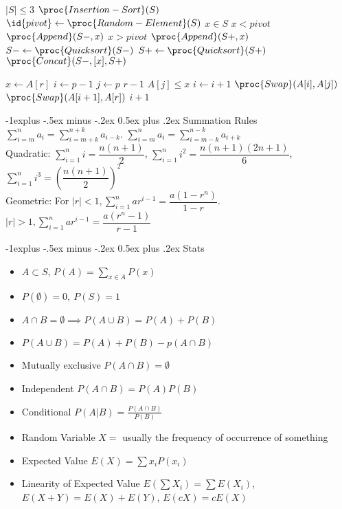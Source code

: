 \documentclass[letterpaper, 8pt]{extarticle}
\makeatletter
\renewcommand{\section}{\@startsection{section}{1}{0mm}%
                                {-1explus -.5ex minus -.2ex}%
                                {0.5ex plus .2ex}%
                                {\normalfont\normalsize\bfseries}}
\renewcommand{\subsection}{\@startsection{subsection}{2}{0mm}%
                                {-1explus -.5ex minus -.2ex}%
                                {0.5ex plus .2ex}%
                                {\normalfont\small\bfseries}}
\makeatother
\begin{document}
\begin{multicols*}{5}
\begin{codebox}
\li \If $|S| \leq 3$ \Then
\li     \Return $\proc{Insertion-Sort}(S)$
\li \Else
\li     $\id{pivot} \gets \proc{Random-Element}(S)$
\li     \For $x \in S$ \Do
\li         \If $x < pivot$ \Then
\li             $\proc{Append}(S-, x)$
            \End
\li         \If $x > pivot$ \Then
\li             $\proc{Append}(S+, x)$
            \End
        \End
\li     $S- \gets \proc{Quicksort}(S-)$
\li     $S+ \gets \proc{Quicksort}(S+)$
\li     \Return $\proc{Concat}(S-, [x], S+)$
\end{codebox}

\begin{codebox}
\li $x \gets A[r]$
\li $i \gets p - 1$
\li \For $j \gets p$ \To $r - 1$ \Do
\li     \If $A[j] \leq x$ \Then
\li         $i \gets i + 1$
\li         $\proc{Swap}(A[i], A[j])$
        \End
    \End
\li  $\proc{Swap}(A[i + 1], A[r])$
\li \Return $i + 1$
\end{codebox}



\section{Summation Rules}
$\sum^n_{i=m} a_i  = \sum^{n+k}_{i=m+k} a_{i-k}$. $\sum^n_{i=m} a_i  = \sum^{n-k}_{i=m-k} a_{i+k}$\\
Quadratic: $\sum^n_{i=1} i = \dfrac{n(n+1)}{2}$, $\sum^n_{i=1} i^2 = \dfrac{n(n+1)(2n+1)}{6}$, $\sum^n_{i=1} i^3 = (\dfrac{n(n+1)}{2})^2$\\
Geometric: For $|r| < 1, \sum^n_{i=1} ar^{i-1} = \dfrac{a(1-r^n)}{1-r}$. $|r| > 1, \sum^n_{i=1} ar^{i-1} = \dfrac{a(r^n-1)}{r-1}$

\section{Stats}
\begin{itemize}
    \item $A\subset S$, $P(A) = \sum_{x\in A}P(x)$
    \item $P(\emptyset) = 0,\ P(S) = 1$
    \item $A \cap B = \emptyset \implies P(A \cup B) = P(A) + P(B)$
    \item $P(A \cup B) = P(A) + P(B) - p(A\cap B)$
    \item Mutually exclusive $P(A\cap B) = \emptyset$
    \item Independent $P(A\cap B) = P(A)P(B)$
    \item Conditional $P(A|B) = \frac{P(A\cap B)}{P(B)}$
    \item Random Variable $X =$ usually the frequency of occurrence of something
    \item Expected Value $E(X) = \sum x_i P(x_i)$
    \item Linearity of Expected Value $E(\sum X_i) = \sum E(X_i)$, $E(X+Y) = E(X) + E(Y)$, $E(cX) = cE(X)$
\end{itemize}

\end{multicols*}
\end{document}
